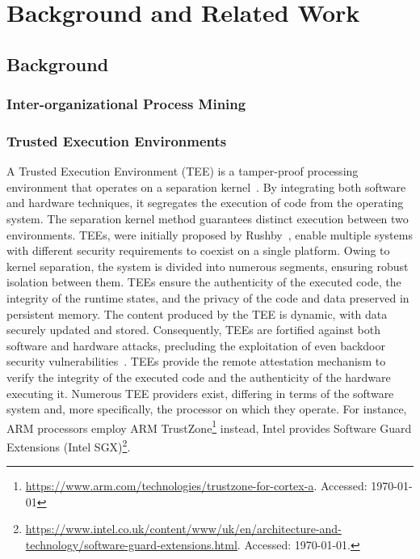 \section{Background and Related Work}
\begin{newj}
\subsection{Background}
\label{sec:background}
\subsubsection{Inter-organizational Process Mining}



\subsubsection{Trusted Execution Environments}
\label{sec:background:tee}
A Trusted Execution Environment (TEE) is a tamper-proof processing environment that operates on a separation kernel~\citep{mcgillion2015open}. By integrating both software and hardware techniques, it segregates the execution of code from the operating system. The separation kernel method guarantees distinct execution between two environments.
TEEs, were initially proposed by Rushby~\citet{rushby1981design}, enable multiple systems with different security requirements to coexist on a single platform. Owing to kernel separation, the system is divided into numerous segments, ensuring robust isolation between them.
TEEs ensure the authenticity of the executed code, the integrity of the runtime states, and the privacy of the code and data preserved in persistent memory. The content produced by the TEE is dynamic, with data securely updated and stored. Consequently, TEEs are fortified against both software and hardware attacks, precluding the exploitation of even backdoor security vulnerabilities~\citep{DBLP:conf/trustcom/SabtAB15}. TEEs provide the remote attestation mechanism to verify the integrity of the executed code and the authenticity of the hardware executing it. Numerous TEE providers exist, differing in terms of the software system and, more specifically, the processor on which they operate. For instance, ARM processors employ ARM TrustZone\footnote{\url{https://www.arm.com/technologies/trustzone-for-cortex-a}. Accessed: \today} instead, Intel provides Software Guard Extensions (Intel SGX)\footnote{\url{https://www.intel.co.uk/content/www/uk/en/architecture-and-technology/software-guard-extensions.html}. Accessed: \today.}. 


\end{newj}
